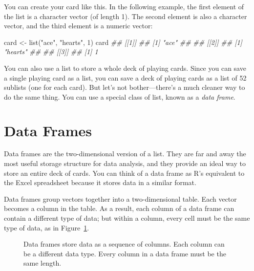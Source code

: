 \documentclass[
  letterpaper,
  DIV=11,
  numbers=noendperiod]{scrbook}
\makeatletter
\newenvironment{Shaded}{\begin{snugshade}}{\end{snugshade}}
\newcommand{\DecValTok}[1]{\textcolor[rgb]{0.68,0.00,0.00}{#1}}
\newcommand{\DocumentationTok}[1]{\textcolor[rgb]{0.37,0.37,0.37}{\textit{#1}}}
\newcommand{\FunctionTok}[1]{\textcolor[rgb]{0.28,0.35,0.67}{#1}}
\newcommand{\NormalTok}[1]{\textcolor[rgb]{0.00,0.23,0.31}{#1}}
\newcommand{\OtherTok}[1]{\textcolor[rgb]{0.00,0.23,0.31}{#1}}
\newcommand{\StringTok}[1]{\textcolor[rgb]{0.13,0.47,0.30}{#1}}
\newcommand*\pandocbounded[1]{%
  \sbox\pandoc@box{#1}%
  \Gscale@div\@tempa{\textheight}{\dimexpr\ht\pandoc@box+\dp\pandoc@box\relax}%
  \Gscale@div\@tempb{\linewidth}{\wd\pandoc@box}%
  \ifdim\@tempb\p@<\@tempa\p@\let\@tempa\@tempb\fi%
  \ifdim\@tempa\p@<\p@\scalebox{\@tempa}{\usebox\pandoc@box}%
  \else\usebox{\pandoc@box}%
  \fi%
}
\makeatother
\begin{document}
You can create your card like this. In the following example, the first
element of the list is a character vector (of length 1). The second
element is also a character vector, and the third element is a numeric
vector:

\begin{Shaded}
\begin{Highlighting}[]
\NormalTok{card }\OtherTok{\textless{}{-}} \FunctionTok{list}\NormalTok{(}\StringTok{"ace"}\NormalTok{, }\StringTok{"hearts"}\NormalTok{, }\DecValTok{1}\NormalTok{)}
\NormalTok{card}
\DocumentationTok{\#\# [[1]]}
\DocumentationTok{\#\# [1] "ace"}
\DocumentationTok{\#\#}
\DocumentationTok{\#\# [[2]]}
\DocumentationTok{\#\# [1] "hearts"}
\DocumentationTok{\#\#}
\DocumentationTok{\#\# [[3]]}
\DocumentationTok{\#\# [1] 1}
\end{Highlighting}
\end{Shaded}

You can also use a list to store a whole deck of playing cards. Since
you can save a single playing card as a list, you can save a deck of
playing cards as a list of 52 sublists (one for each card). But let's
not bother---there's a much cleaner way to do the same thing. You can
use a special class of list, known as a \emph{data frame}.

\section{Data Frames}\label{data-frames}

Data frames are the two-dimensional version of a list. They are far and
away the most useful storage structure for data analysis, and they
provide an ideal way to store an entire deck of cards. You can think of
a data frame as R's equivalent to the Excel spreadsheet because it
stores data in a similar format.

Data frames group vectors together into a two-dimensional table. Each
vector becomes a column in the table. As a result, each column of a data
frame can contain a different type of data; but within a column, every
cell must be the same type of data, as in Figure~\ref{fig-data-frame}.

\begin{figure}

\centering{

\pandocbounded{\texttt{[image: images/hopr\_0302.png]}}

}

\caption{\label{fig-data-frame}Data frames store data as a sequence of
columns. Each column can be a different data type. Every column in a
data frame must be the same length.}

\end{figure}%
\end{document}
